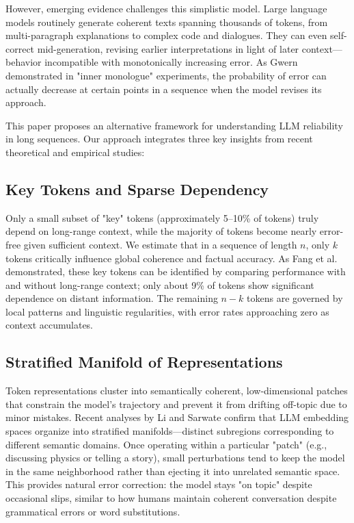 \documentclass{article}
\begin{document}
However, emerging evidence challenges this simplistic model. Large language models routinely generate coherent texts spanning thousands of tokens, from multi-paragraph explanations to complex code and dialogues. They can even self-correct mid-generation, revising earlier interpretations in light of later context—behavior incompatible with monotonically increasing error. As Gwern \citep{gwern2023inner} demonstrated in "inner monologue" experiments, the probability of error can actually decrease at certain points in a sequence when the model revises its approach.

This paper proposes an alternative framework for understanding LLM reliability in long sequences. Our approach integrates three key insights from recent theoretical and empirical studies:

\subsection{Key Tokens and Sparse Dependency}

Only a small subset of "key" tokens (approximately 5–10\% of tokens) truly depend on long-range context, while the majority of tokens become nearly error-free given sufficient context. We estimate that in a sequence of length $n$, only $k$ tokens critically influence global coherence and factual accuracy. As Fang et al. \citep{fang2024what} demonstrated, these key tokens can be identified by comparing performance with and without long-range context; only about 9\% of tokens show significant dependence on distant information. The remaining $n-k$ tokens are governed by local patterns and linguistic regularities, with error rates approaching zero as context accumulates.

\subsection{Stratified Manifold of Representations}

Token representations cluster into semantically coherent, low-dimensional patches that constrain the model's trajectory and prevent it from drifting off-topic due to minor mistakes. Recent analyses by Li and Sarwate \citep{li2025unraveling} confirm that LLM embedding spaces organize into stratified manifolds—distinct subregions corresponding to different semantic domains. Once operating within a particular "patch" (e.g., discussing physics or telling a story), small perturbations tend to keep the model in the same neighborhood rather than ejecting it into unrelated semantic space. This provides natural error correction: the model stays "on topic" despite occasional slips, similar to how humans maintain coherent conversation despite grammatical errors or word substitutions.
\end{document}
